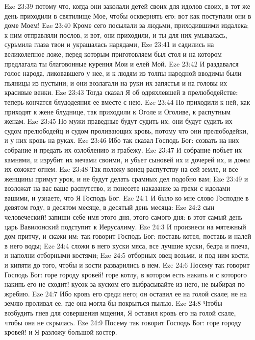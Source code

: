 \vs Eze 23:39 потому что, когда они заколали детей своих для идолов своих, в тот же день приходили в святилище Мое, чтобы осквернять его: вот как поступали они в доме Моем!
\vs Eze 23:40 Кроме сего посылали за людьми, приходившими издалека; к ним отправляли послов, и вот, они приходили, и ты для них умывалась, сурьмила глаза твои и украшалась нарядами,
\vs Eze 23:41 и садились на великолепное ложе, перед которым приготовляем был стол и на котором предлагала ты благовонные курения Мои и елей Мой.
\vs Eze 23:42 И раздавался голос народа, ликовавшего у нее, и к людям из толпы народной вводимы были пьяницы из пустыни; и они возлагали на руки их запястья и на головы их красивые венки.
\vs Eze 23:43 Тогда сказал Я об одряхлевшей в прелюбодействе: теперь кончатся блудодеяния ее вместе с нею.
\vs Eze 23:44 Но приходили к ней, как приходят к жене блуднице, так приходили к Оголе и Оголиве, к распутным женам.
\vs Eze 23:45 Но мужи праведные будут судить их; они будут судить их судом прелюбодейц и судом проливающих кровь, потому что они прелюбодейки, и у них кровь на руках.
\vs Eze 23:46 Ибо так сказал Господь Бог: созвать на них собрание и предать их озлоблению и грабежу.
\vs Eze 23:47 И собрание побьет их камнями, и изрубит их мечами своими, и убьет сыновей их и дочерей их, и домы их сожжет огнем.
\vs Eze 23:48 Так положу конец распутству на сей земле, и все женщины примут урок, и не будут делать срамных дел подобно вам;
\vs Eze 23:49 и возложат на вас ваше распутство, и понесете наказание за грехи с идолами вашими, и узнаете, что Я Господь Бог.
\vs Eze 24:1 И было ко мне слово Господне в девятом году, в десятом месяце, в десятый день месяца:
\vs Eze 24:2 сын человеческий! запиши себе имя этого дня, этого самого дня: в этот самый день царь Вавилонский подступит к Иерусалиму.
\vs Eze 24:3 И произнеси на мятежный дом притчу, и скажи им: так говорит Господь Бог: поставь котел, поставь и налей в него воды;
\vs Eze 24:4 сложи в него куски мяса, все лучшие куски, бедра и плеча, и наполни отборными костями;
\vs Eze 24:5 отборных овец возьми, и  под ним кости, и кипяти до того, чтобы и кости разварились в нем.
\vs Eze 24:6 Посему так говорит Господь Бог: горе городу кровей! горе котлу, в котором есть накипь и с которого накипь его не сходит! кусок за куском его выбрасывайте из него, не выбирая по жребию.
\vs Eze 24:7 Ибо кровь его среди него; он оставил ее на голой скале; не на землю проливал ее, где она могла бы покрыться пылью.
\vs Eze 24:8 Чтобы возбудить гнев для совершения мщения, Я оставил кровь его на голой скале, чтобы она не скрылась.
\vs Eze 24:9 Посему так говорит Господь Бог: горе городу кровей! и Я разложу большой костер.
